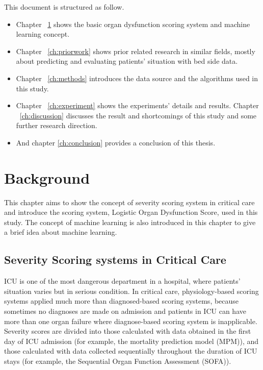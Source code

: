 \documentclass[12pt,a4paper,english
]{tunithesis}
\begin{document}
This document is structured as follow. 
\begin{itemize}
\item Chapter ~\ref{ch:background} shows the basic organ dysfunction scoring system and machine learning concept. 
\item Chapter ~\ref{ch:priorwork} shows prior related research in similar fields, mostly about predicting and evaluating patients' situation with bed side data. 
\item Chapter ~\ref{ch:methods} introduces the data source and the algorithms used in this study. 
\item Chapter ~\ref{ch:experiment} shows the experiments' details and results. Chapter ~\ref{ch:discussion} discusses the result and shortcomings of this study and some further research direction. 
\item And chapter \ref{ch:conclusion} provides a conclusion of this thesis.
\end{itemize}


\chapter{Background}
\label{ch:background}
This chapter aims to show the concept of severity scoring system in critical care and introduce the scoring system, Logistic Organ Dysfunction Score, used in this study. The concept of machine learning is also introduced in this chapter to give a brief idea about machine learning.

\section{Severity Scoring systems in Critical Care}
ICU is one of the most dangerous department in a hospital, where patients' situation varies but in serious condition. In critical care, physiology-based scoring systems applied much more than diagnosed-based scoring systems, because sometimes no diagnoses are made on admission and patients in ICU can have more than one organ failure where diagnose-based scoring system is inapplicable. \parencite{Bouch2008} Severity scores are divided into those calculated with data obtained in the first day of ICU admission (for example, the mortality prediction model (MPM)), and those calculated with data collected sequentially throughout the duration of ICU stays (for example, the Sequential Organ Function Assessment (SOFA)). 
\end{document}
